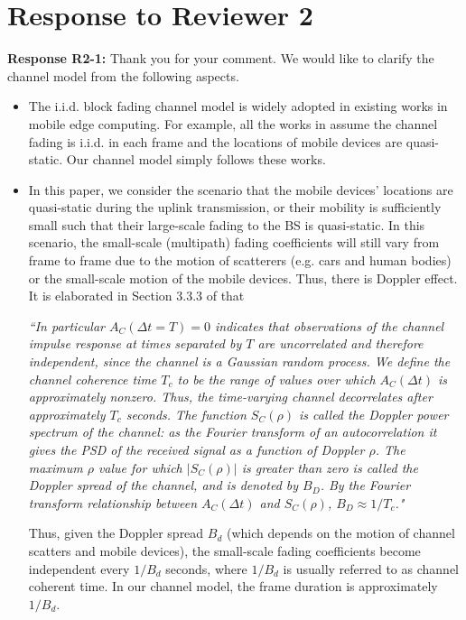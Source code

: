 \documentclass[12pt,onecolumn]{IEEEtran}
\newcommand{\blue}{\color{blue}}
\newcommand{\spaceblank}{\vskip 4mm}
\begin{document}
\section{Response to Reviewer 2}
\spaceblank
{}
\spaceblank
{\blue \textbf{Response R2-1:} Thank you for your comment. We would like to clarify the channel model from the following aspects. 
\begin{itemize}
	\item The i.i.d. block fading channel model is widely adopted in existing works in mobile edge computing. For example, all the works in \cite{huang2012dynamic,mao2016dynamicmec,mao2016power-delay,liu2016delayopt, Ko2018HetnetMEC} assume the channel fading is i.i.d. in each frame and the locations of mobile devices are quasi-static. Our channel model simply follows these works.
	\item In this paper, we consider the scenario that the mobile devices' locations are quasi-static during the uplink transmission, or their mobility is sufficiently small such that their large-scale fading to the BS is quasi-static. In this scenario, the small-scale (multipath) fading coefficients will still vary from frame to frame due to the motion of scatterers (e.g. cars and human bodies) or the small-scale motion of the mobile devices. Thus, there is Doppler effect. It is elaborated in Section 3.3.3 of \cite{goldsmith_2005} that 
	
	\emph{``In particular $A_C(\Delta t = T ) = 0$ indicates that observations of the channel impulse response at times separated by $T$ are uncorrelated and therefore independent, since the channel is a Gaussian random process. We define the channel coherence time $T_c$ to be the range of values over which $A_C(\Delta t)$ is approximately nonzero. Thus, the time-varying channel decorrelates after approximately $T_c$ seconds. The function $S_C(\rho)$ is called the Doppler power spectrum of the channel: as the Fourier transform of an autocorrelation it gives the PSD of the received signal as a function of Doppler $\rho$. The maximum $\rho$ value for which $|S_C(\rho)|$ is greater than zero is called the Doppler spread of the channel, and is denoted by $B_D$. By the Fourier transform relationship between $A_C(\Delta t)$ and $S_C(\rho)$, $B_D \approx 1/T_c$."} 

	\noindent Thus, given the Doppler spread $B_d$ (which depends on the motion of channel scatters and mobile devices), the small-scale fading coefficients become independent every $1/B_d$ seconds, where $1/B_d$ is usually referred to as channel coherent time. In our channel model, the frame duration is approximately $1/B_d$.
\end{itemize}
}
\end{document}
